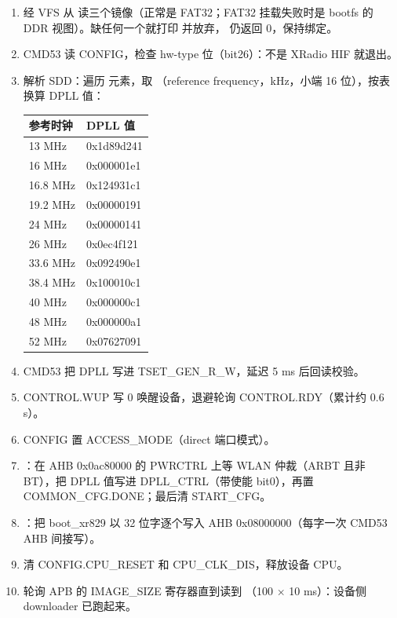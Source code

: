 \begin{enumerate}
  \item {} 经 VFS 从  读三个镜像（正常是 FAT32；FAT32 挂载失败时是 bootfs 的 DDR 视图）。缺任何一个就打印  并放弃， 仍返回 0，保持绑定。
  \item CMD53 读 CONFIG，检查 hw-type 位（bit26）：不是 XRadio HIF 就退出。
  \item 解析 SDD：遍历  元素，取 （reference frequency，kHz，小端 16 位），按表换算 DPLL 值：

  \begin{table}[H]
  \centering
  \begin{tabular}{ll}
  \toprule
  参考时钟 & DPLL 值 \\
  \midrule
  13 MHz & 0x1d89d241 \\
  16 MHz & 0x000001e1 \\
  16.8 MHz & 0x124931c1 \\
  19.2 MHz & 0x00000191 \\
  24 MHz & 0x00000141 \\
  26 MHz & 0x0ec4f121 \\
  33.6 MHz & 0x092490e1 \\
  38.4 MHz & 0x100010c1 \\
  40 MHz & 0x000000c1 \\
  48 MHz & 0x000000a1 \\
  52 MHz & 0x07627091 \\
  \bottomrule
  \end{tabular}
  \end{table}

  \item CMD53 把 DPLL 写进 TSET\_GEN\_R\_W，延迟 5 ms 后回读校验。
  \item CONTROL.WUP 写 0 唤醒设备，退避轮询 CONTROL.RDY（累计约 0.6 s）。
  \item CONFIG 置 ACCESS\_MODE（direct 端口模式）。
  \item {}：在 AHB 0x0ac80000 的 PWRCTRL 上等 WLAN 仲裁（ARBT 且非 BT），把 DPLL 值写进 DPLL\_CTRL（带使能 bit0），再置 COMMON\_CFG.DONE；最后清 START\_CFG。
  \item {}：把 boot\_xr829 以 32 位字逐个写入 AHB 0x08000000（每字一次 CMD53 AHB 间接写）。
  \item 清 CONFIG.CPU\_RESET 和 CPU\_CLK\_DIS，释放设备 CPU。
  \item 轮询 APB 的 IMAGE\_SIZE 寄存器直到读到 （100 $\times$ 10 ms）：设备侧 downloader 已跑起来。
\end{enumerate}

